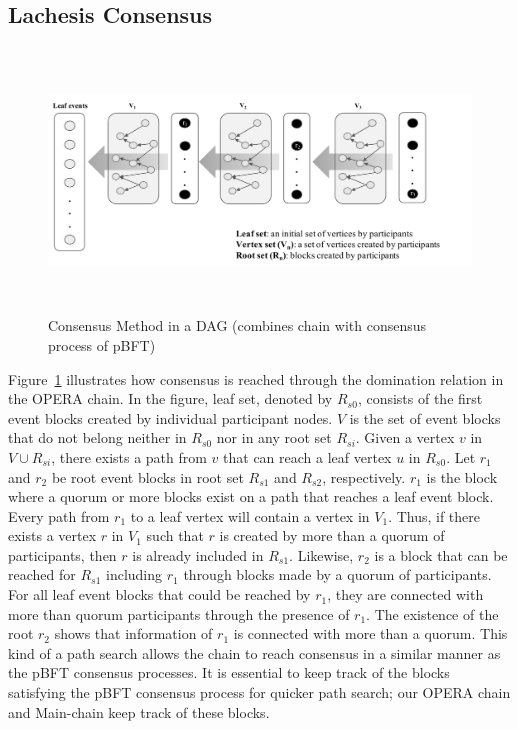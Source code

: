 \documentclass{article}
\begin{document}
\newpage
\subsection{Lachesis Consensus}

\begin{figure}[H] \centering
\includegraphics[height=7cm, width=1.0\columnwidth]{pBFTtoPath}
\caption{Consensus Method in a DAG (combines chain with consensus process of pBFT)}
\label{fig:pBFTtoPath}
\end{figure}
Figure~\ref{fig:pBFTtoPath} illustrates how consensus is reached through the domination relation in the OPERA chain. In the figure, leaf set, denoted by $R_{s0}$, consists of the first event blocks created by individual participant nodes. $V$ is the set of event blocks that do not belong neither in $R_{s0}$ nor in any root set $R_{si}$.
Given a vertex $v$ in $V \cup R_{si}$, there exists a path from $v$ that can reach a leaf vertex $u$ in $R_{s0}$. 
Let $r_1$ and $r_2$ be root event blocks in root set $R_{s1}$ and $R_{s2}$, respectively.
$r_1$ is the block where a quorum or more blocks exist on a path that reaches a leaf event block. 
Every path from $r_1$ to a leaf vertex will contain a vertex in $V_1$. Thus, if there exists a vertex $r$ in $V_1$ such that $r$ is created by more than a quorum of participants, then $r$ is already included in $R_{s1}$. Likewise, $r_2$ is a block that can be reached for $R_{s1}$ including $r_1$ through blocks made by a quorum of participants.
For all leaf event blocks that could be reached by $r_1$, they are connected with more than quorum participants through the presence of $r_1$. The existence of the root $r_2$ shows that information of $r_1$ is connected with more than a quorum. 
This kind of a path search allows the chain to reach consensus in a similar manner as the pBFT consensus processes. It is essential to keep track of the blocks satisfying the pBFT consensus process for quicker path search; our OPERA chain and Main-chain keep track of these blocks.
\end{document}
